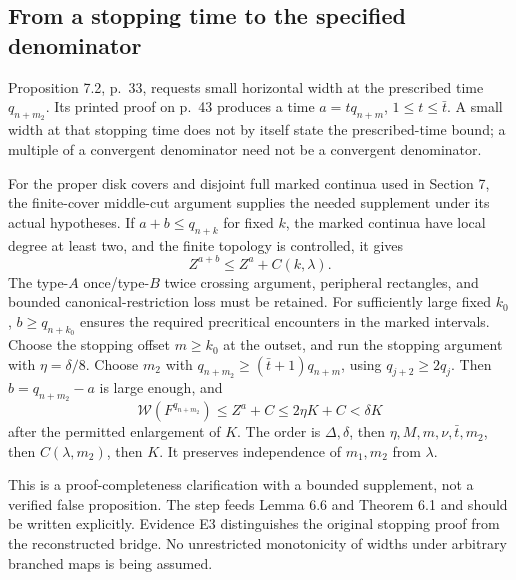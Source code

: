 \documentclass[10pt]{article}
\begin{document}
\subsection*{From a stopping time to the specified denominator}
Proposition 7.2, p. 33, requests small horizontal width at the prescribed time \(q_{n+m_2}\). Its printed proof on p. 43 produces a time \(a=tq_{n+m}\), \(1\leq t\leq\bar t\). A small width at that stopping time does not by itself state the prescribed-time bound; a multiple of a convergent denominator need not be a convergent denominator.\par
For the proper disk covers and disjoint full marked continua used in Section 7, the finite-cover middle-cut argument supplies the needed supplement under its actual hypotheses. If \(a+b\leq q_{n+k}\) for fixed \(k\), the marked continua have local degree at least two, and the finite topology is controlled, it gives \[Z^{a+b}\leq Z^a+C(k,\lambda).\] The type-\(A\) once/type-\(B\) twice crossing argument, peripheral rectangles, and bounded canonical-restriction loss must be retained. For sufficiently large fixed \(k_0\), \(b\geq q_{n+k_0}\) ensures the required precritical encounters in the marked intervals. Choose the stopping offset \(m\geq k_0\) at the outset, and run the stopping argument with \(\eta=\delta/8\). Choose \(m_2\) with \(q_{n+m_2}\geq(\bar t+1)q_{n+m}\), using \(q_{j+2}\geq2q_j\). Then \(b=q_{n+m_2}-a\) is large enough, and \[\mathcal W(F^{q_{n+m_2}})\leq Z^a+C\leq2\eta K+C<\delta K\] after the permitted enlargement of \(K\). The order is \(\Delta,\delta\), then \(\eta,M,m,\nu,\bar t,m_2\), then \(C(\lambda,m_2)\), then \(K\). It preserves independence of \(m_1,m_2\) from \(\lambda\).\par
This is a proof-completeness clarification with a bounded supplement, not a verified false proposition. The step feeds Lemma 6.6 and Theorem 6.1 and should be written explicitly. Evidence E3 distinguishes the original stopping proof from the reconstructed bridge. No unrestricted monotonicity of widths under arbitrary branched maps is being assumed.\par
\end{document}

